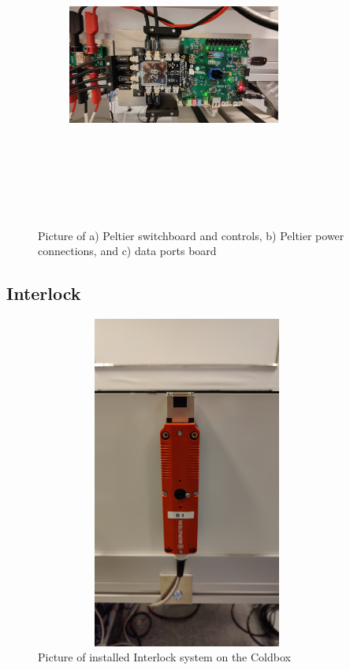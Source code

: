 \begin{figure}[h]
    \begin{subfigure}[b]{0.45\textwidth}
        \centering
        \includegraphics[width=7cm,height=10cm,keepaspectratio]{Figures/test/connections-4.jpg}
        \caption{}\label{fig:data}
    \end{subfigure}
    \caption{Picture of a) Peltier switchboard and controls, b) Peltier power connections, and c) data ports board}
    \label{fig:boards}
\end{figure}

\newpage
\subsection{Interlock}
\begin{figure}[h]
    \centering
    \includegraphics[width=10cm,height=11cm,keepaspectratio]{Figures/test/interlock.jpg}
    \caption{Picture of installed Interlock system on the Coldbox}
    \label{fig:interlock}
\end{figure}

